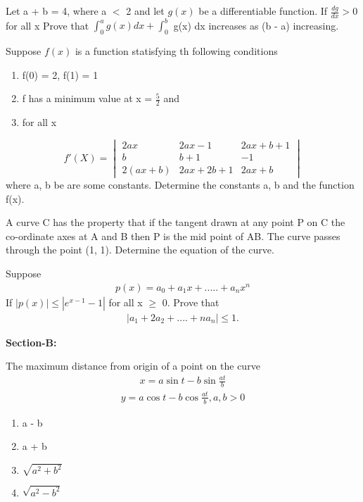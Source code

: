 \item Let a + b = 4, where a $<$ 2 and let $g(x)$ be a differentiable function. If $\frac{dg}{dx} > 0$ for all x Prove that $\int_{0}^{a} g(x) dx + \int_{0}^{b}$ g(x) dx increases as (b - a) increasing.

\item Suppose $f(x)$ is a function statisfying th following conditions 
\begin{enumerate}
\item f(0) = 2, f(1) = 1
\item f has a minimum value at x = $\frac{5}{2}$ and 
\item for all x
\end{enumerate}
\[
f'(X) =
\begin{vmatrix}
2ax & 2ax - 1 & 2ax + b + 1  \\ 
b & b + 1 & -1  \\
2(ax + b) & 2ax + 2b + 1 & 2ax + b 
\end{vmatrix}
\]
where a, b be are some constants. Determine the constants a, b and the function f(x).

\item A  curve C has the property that if the tangent drawn at any point P on C the co-ordinate axes at A and B then P is the mid point of AB. The curve passes through the point (1, 1). Determine the equation of the curve.

\item Suppose
\begin{align*} 
p(x) = a_0 + a_1x + ..... + a_nx^n
\end{align*} 
If $|p(x)|\leq |e^{x - 1} - 1|$ for all x $\geq$ 0. Prove that 
\begin{align*}
|a_1 + 2a_2 + ....+na_n| \leq 1.
\end{align*}

\textbf{Section-B:}


\item The maximum distance from origin of a point on the curve 
\begin{align*}
x = a\sin t - b\sin\frac{at}{b}
\end{align*}
\begin{align*}
y = a\cos t - b\cos \frac{at}{b}, a, b > 0
\end{align*}
\begin{enumerate}
\item a - b
\item a + b
\item $\sqrt{a^2 + b^2}$
\item $\sqrt{a^2 - b^2}$
\end{enumerate}

